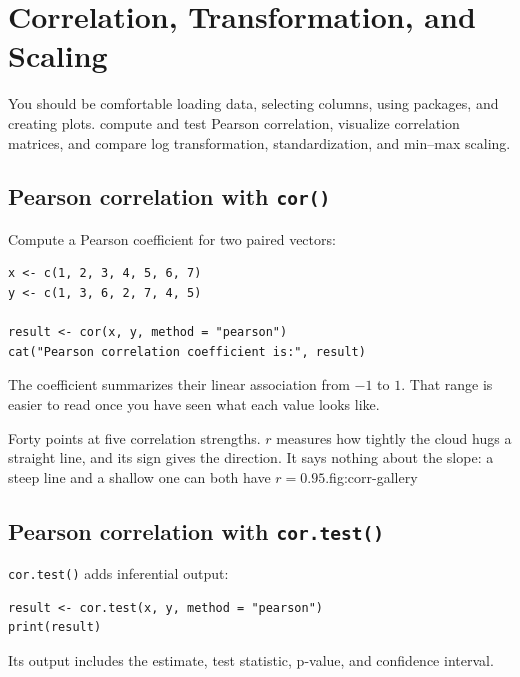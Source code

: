 \chapter{Correlation, Transformation, and Scaling}
\label{chap:correlation-normalization}

\chapterguide
  {You should be comfortable loading data, selecting columns, using packages, and creating plots.}
  {compute and test Pearson correlation, visualize correlation matrices, and compare log transformation, standardization, and min--max scaling.}

\section{Pearson correlation with \texttt{cor()}}

Compute a Pearson coefficient for two paired vectors:

\begin{lstlisting}[style=dsr]
x <- c(1, 2, 3, 4, 5, 6, 7)
y <- c(1, 3, 6, 2, 7, 4, 5)

result <- cor(x, y, method = "pearson")
cat("Pearson correlation coefficient is:", result)
\end{lstlisting}

The coefficient summarizes their linear association from $-1$ to $1$. That
range is easier to read once you have seen what each value looks like.

\begin{utpfig}{Forty points at five correlation strengths.
$r$ measures how tightly the cloud hugs a straight line, and its sign gives the
direction. It says nothing about the slope: a steep line and a shallow one can
both have $r = 0.95$.}{fig:corr-gallery}

\end{utpfig}

\section{Pearson correlation with \texttt{cor.test()}}

\texttt{cor.test()} adds inferential output:

\begin{lstlisting}[style=dsr]
result <- cor.test(x, y, method = "pearson")
print(result)
\end{lstlisting}

Its output includes the estimate, test statistic, p-value, and confidence interval.

